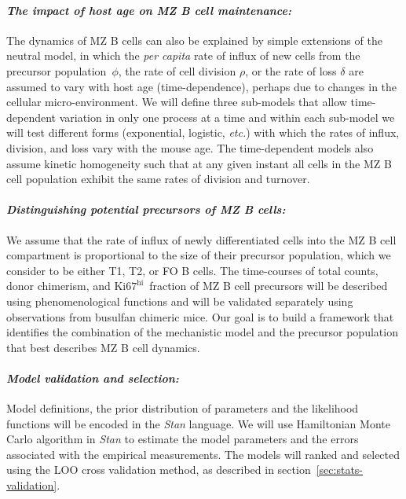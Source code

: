 \documentclass[11pt]{article}
\newcommand{\khi}{\ensuremath{\text{Ki67}^\text{hi}}~}
\newcommand{\para}[1]{\vspace*{-4.5mm}\paragraph{#1}}
\begin{document}
\para{\textit{The impact of host age on MZ B cell maintenance:}}
The dynamics of MZ B cells can also be explained by simple extensions of the neutral model, in which the \textit{per capita} rate of influx of new cells from the precursor population~$\phi$, the rate of cell division $\rho$, or the rate of loss $\delta$  are assumed to vary with host age (time-dependence), perhaps due to changes in  the cellular micro-environment.
We will define three sub-models that allow time-dependent variation in only one process at a time and within each sub-model we will test different forms (exponential, logistic, \textit{etc.}) with which the rates of influx, division, and loss vary with the mouse age.
The time-dependent models also assume kinetic homogeneity such that at any given instant all cells in the MZ B cell population exhibit the same 
rates of division and turnover. 

\para{\textit{Distinguishing potential precursors of MZ B cells:}}
We assume that the rate of influx of newly differentiated cells into the MZ B cell compartment is proportional to the size of their precursor population, which we consider to be either T1, T2, or FO B cells.
The time-courses of total counts, donor chimerism, and \khi fraction of MZ B cell precursors will be described using phenomenological functions and will be validated separately using observations from busulfan chimeric mice.
Our goal is to build a framework that identifies the combination of the mechanistic model and the precursor population that best describes MZ B cell dynamics. %

\para{\textit{Model validation and selection:}}
Model definitions, the prior distribution of parameters and the likelihood functions will be encoded in the \textit{Stan} language.
We will use Hamiltonian Monte Carlo algorithm in \textit{Stan} to estimate the model parameters and the errors associated with the empirical measurements.
The models will ranked and selected using the LOO cross validation method, as described in section~\ref{sec:stats-validation}.
\end{document}

